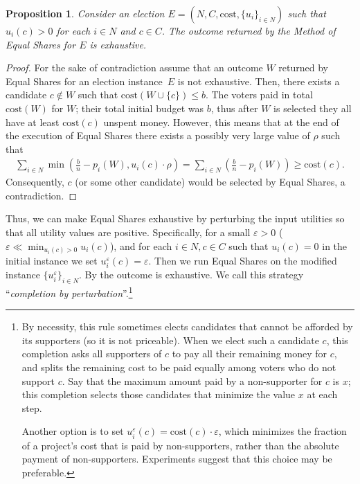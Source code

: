 \documentclass[10pt]{scrartcl}
\renewcommand*{\leq}{\leqslant}
\renewcommand*{\geq}{\geqslant}
\renewcommand{\epsilon}{\varepsilon}
\newcommand{\cost}{{{\mathrm{cost}}}}
\theoremstyle{definition}
\theoremstyle{plain}
\newtheorem{proposition}{Proposition}
\begin{document}
\begin{proposition}\label{prop:exhaustive_rule_x}
	Consider an election $E = (N, C, \cost, \{u_i\}_{i \in N})$ such that $u_i(c) > 0$ for each $i \in N$ and  $c \in C$. The outcome returned by the Method of Equal Shares for $E$ is exhaustive.
\end{proposition}
\begin{proof}
	For the sake of contradiction assume that an outcome $W$ returned by Equal Shares for an election instance~$E$ is not exhaustive. Then, there exists a candidate $c \notin W$ such that $\cost(W \cup \{c\}) \leq b$. The voters paid in total $\cost(W)$ for $W$; their total initial budget was $b$, thus after $W$ is selected they all have at least $\cost(c)$ unspent money. However, this means that at the end of the execution of Equal Shares there exists a possibly very large value of $\rho$ such that
	\begin{align*}
		\sum_{i \in N} \min\left( \tfrac{b}{n} - p_i(W), u_i(c)\cdot\rho \right) =  \sum_{i \in N} \left( \tfrac{b}{n} - p_i(W)\right) \geq \cost(c) \text{.}
	\end{align*}
	Consequently, $c$ (or some other candidate) would be selected by Equal Shares, a contradiction.
\end{proof}

Thus, we can make Equal Shares exhaustive by perturbing the input utilities so that all utility values are positive. Specifically, for a small $\epsilon > 0$ ($\epsilon \ll \min_{u_i(c) > 0} u_i(c)$), and for each $i \in N, c \in C$ such that $u_i(c) = 0$ in the initial instance we set $u_i^\epsilon(c) = \epsilon$.
Then we run Equal Shares on the modified instance $\{u_i^\epsilon\}_{i \in N}$. By  the outcome is exhaustive. We call this strategy ``\emph{completion by perturbation}''.\footnote{By necessity, this rule sometimes elects candidates that cannot be afforded by its supporters (so it is not priceable). When we elect such a candidate $c$, this completion asks all supporters of $c$ to pay all their remaining money for $c$, and splits the remaining cost to be paid equally among voters who do not support $c$. Say that the maximum amount paid by a non-supporter for $c$ is $x$; this completion selects those candidates that minimize the value $x$ at each step. 

Another option is to set $u_i^\epsilon(c) = \cost(c) \cdot \epsilon$, which minimizes the fraction of a project's cost that is paid by non-supporters, rather than the absolute payment of non-supporters. Experiments suggest that this choice may be preferable.}
\end{document}
